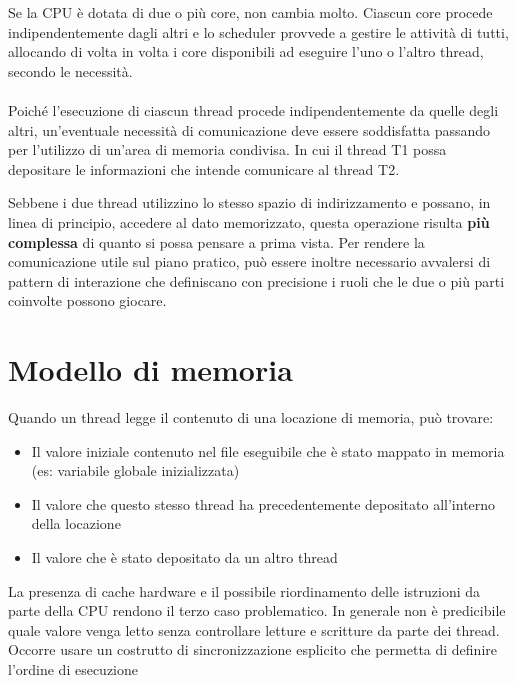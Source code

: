Se la CPU è dotata di due o più core, non cambia molto. Ciascun core procede
indipendentemente dagli altri e lo scheduler provvede a gestire le attività di
tutti, allocando di volta in volta i core disponibili ad eseguire l'uno o
l'altro thread, secondo le necessità.


\paragraph{}

Poiché l'esecuzione di ciascun thread procede indipendentemente da quelle degli
altri, un'eventuale necessità di comunicazione deve essere soddisfatta passando
per l'utilizzo di un'area di memoria condivisa. In cui il thread T1 possa
depositare le informazioni che intende comunicare al thread T2.

Sebbene i due
thread utilizzino lo stesso spazio di indirizzamento e possano, in linea di
principio, accedere al dato memorizzato, questa operazione risulta \textbf{più complessa}
di quanto si possa pensare a prima vista. Per rendere la comunicazione utile
sul piano pratico, può essere inoltre necessario avvalersi di pattern di
interazione che definiscano con precisione i ruoli che le due o più parti
coinvolte possono giocare.



\section{Modello di memoria}

Quando un thread legge il contenuto di una locazione di memoria, può trovare:

\begin{itemize}
  \item Il valore iniziale contenuto nel file eseguibile che è stato mappato in memoria (es: variabile globale
        inizializzata)
  \item Il valore che questo stesso thread ha precedentemente depositato all'interno della locazione
  \item Il valore che è stato depositato da un altro thread
\end{itemize}
La presenza di cache hardware e il possibile riordinamento delle istruzioni da parte
della CPU rendono il terzo caso problematico. In generale non è predicibile quale valore venga letto senza controllare letture e scritture da parte dei
thread. Occorre usare un costrutto di sincronizzazione esplicito che permetta di definire l'ordine di esecuzione

